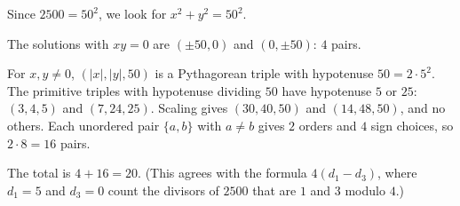 Since $2500=50^2$, we look for $x^2+y^2=50^2$.

The solutions with $xy=0$ are $(\pm50,0)$ and $(0,\pm50)$: $4$ pairs.

For $x,y\ne0$, $(|x|,|y|,50)$ is a Pythagorean triple with hypotenuse $50=2\cdot5^2$. The primitive triples with hypotenuse dividing $50$ have hypotenuse $5$ or $25$: $(3,4,5)$ and $(7,24,25)$. Scaling gives $(30,40,50)$ and $(14,48,50)$, and no others. Each unordered pair $\{a,b\}$ with $a\ne b$ gives $2$ orders and $4$ sign choices, so $2\cdot 8=16$ pairs.

The total is $4+16=\boxed{20}$. (This agrees with the formula $4(d_1-d_3)$, where $d_1=5$ and $d_3=0$ count the divisors of $2500$ that are $1$ and $3$ modulo $4$.)
